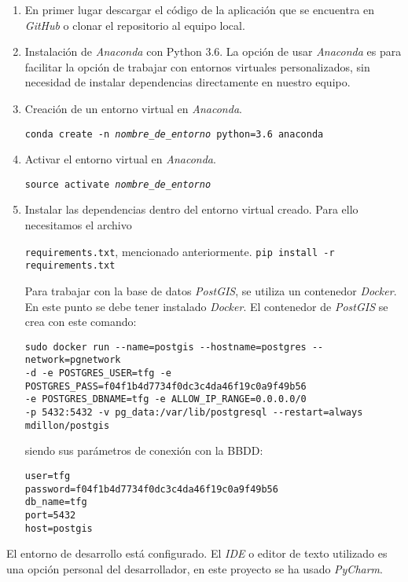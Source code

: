 \begin{enumerate}

\item En primer lugar descargar el código de la aplicación que se encuentra en \emph{GitHub} o clonar el repositorio al equipo local.

\item Instalación de \emph{Anaconda} con Python 3.6. La opción de usar \emph{Anaconda} es para facilitar la opción de trabajar con entornos virtuales personalizados, sin necesidad de instalar dependencias directamente en nuestro equipo.

\item Creación de un entorno virtual en \emph{Anaconda}.

\texttt{conda create -n \emph{nombre\_de\_entorno} python=3.6 anaconda}

\item Activar el entorno virtual en \emph{Anaconda}.

\texttt{source activate  \emph{nombre\_de\_entorno}}

\item Instalar las dependencias dentro del entorno virtual creado. Para ello necesitamos el archivo

\texttt{requirements.txt}, mencionado anteriormente.
\texttt{pip install -r requirements.txt}

 Para trabajar con la base de datos \emph{PostGIS}, se utiliza un contenedor \emph{Docker}. En este punto se debe tener instalado \emph{Docker}. El contenedor de \emph{PostGIS} se crea con este comando:

\begin{verbatim}
sudo docker run --name=postgis --hostname=postgres --network=pgnetwork
-d -e POSTGRES_USER=tfg -e POSTGRES_PASS=f04f1b4d7734f0dc3c4da46f19c0a9f49b56
-e POSTGRES_DBNAME=tfg -e ALLOW_IP_RANGE=0.0.0.0/0 
-p 5432:5432 -v pg_data:/var/lib/postgresql --restart=always mdillon/postgis
\end{verbatim}

siendo sus parámetros de conexión con la BBDD:

\begin{verbatim}
user=tfg
password=f04f1b4d7734f0dc3c4da46f19c0a9f49b56
db_name=tfg
port=5432
host=postgis

\end{verbatim}


\end{enumerate}
El entorno de desarrollo está configurado. El \emph{IDE} o editor de texto utilizado es una opción personal del desarrollador, en este proyecto se ha usado \emph{PyCharm}.



